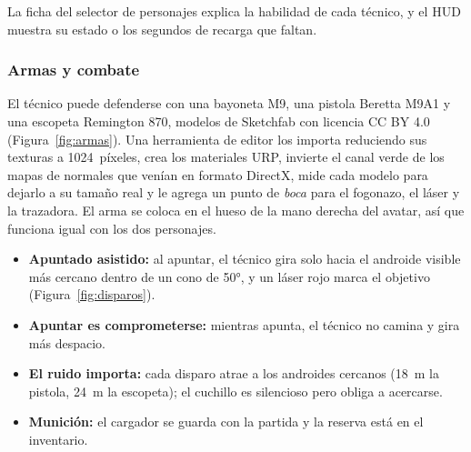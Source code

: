 La ficha del selector de personajes explica la habilidad de cada técnico, y el HUD muestra su estado
o los segundos de recarga que faltan.



\subsubsection{Armas y combate}

El técnico puede defenderse con una bayoneta M9, una pistola Beretta M9A1 y una escopeta Remington
870, modelos de Sketchfab con licencia CC BY 4.0
\parencite{erdogay_m9,do_m9a1,milin_870} (Figura~\ref{fig:armas}). Una herramienta de editor los
importa reduciendo sus texturas a 1024~píxeles, crea los materiales URP, invierte el canal verde de
los mapas de normales que venían en formato DirectX, mide cada modelo para dejarlo a su tamaño real
y le agrega un punto de \textit{boca} para el fogonazo, el láser y la trazadora. El arma se coloca
en el hueso de la mano derecha del avatar, así que funciona igual con los dos personajes.


\begin{itemize}
  \item \textbf{Apuntado asistido:} al apuntar, el técnico gira solo hacia el androide visible más
        cercano dentro de un cono de 50°, y un láser rojo marca el objetivo
        (Figura~\ref{fig:disparos}).
  \item \textbf{Apuntar es comprometerse:} mientras apunta, el técnico no camina y gira más
        despacio.
  \item \textbf{El ruido importa:} cada disparo atrae a los androides cercanos (18~m la pistola,
        24~m la escopeta); el cuchillo es silencioso pero obliga a acercarse.
  \item \textbf{Munición:} el cargador se guarda con la partida y la reserva está en el inventario.
\end{itemize}

